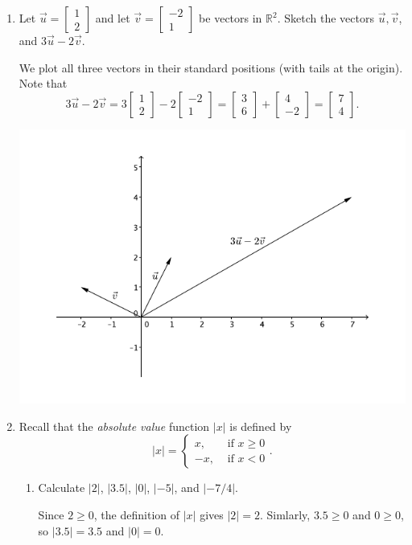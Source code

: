 \documentclass[12pt]{article}
\newcommand{\abs}[1]{\lvert #1\rvert}
\newcommand{\R}{\mathbb{R}}
\newcommand{\bbm}{\begin{bmatrix}}
\newcommand{\ebm}{\end{bmatrix}}
\begin{document}
\begin{enumerate}
\bigskip

\item Let $\vec{u} = \bbm 1\\2\ebm$ and let $\vec{v} = \bbm -2\\1\ebm$ be vectors in $\R^2$. Sketch the vectors $\vec{u}, \vec{v}$, and $3\vec{u}-2\vec{v}$.

\bigskip

We plot all three vectors in their standard positions (with tails at the origin). Note that
\[
 3\vec{u}-2\vec{v} = 3\bbm 1\\2\ebm-2\bbm -2\\1\ebm = \bbm 3\\6\ebm + \bbm 4\\-2\ebm = \bbm 7\\4\ebm.
\]
\begin{center}
 \includegraphics[width=5in]{WS1-3}
\end{center}

\item Recall that the {\em absolute value} function $\abs{x}$ is defined by
\[
 \abs{x} = \begin{cases} x, & \text{ if } x\geq 0\\ -x, & \text{ if } x<0\end{cases}.
\]
\begin{enumerate}
 \item Calculate $\abs{2}$, $\abs{3.5}$, $\abs{0}$, $\abs{-5}$, and $\abs{-7/4}$.

\bigskip

Since $2\geq 0$, the definition of $\abs{x}$ gives $\abs{2}=2$. Simlarly, $3.5\geq 0$ and $0\geq 0$, so $\abs{3.5}=3.5$ and $\abs{0}=0$.


\end{enumerate}
\end{enumerate}
\end{document}
